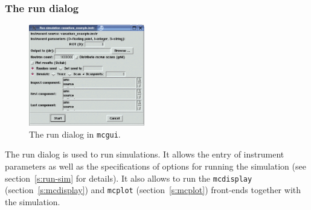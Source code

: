 \subsubsection{The run dialog}

\begin{figure}[htb!]
  \begin{center}
    \includegraphics[width=0.45\textwidth]{figures/mcgui-run.eps}
  \end{center}
\caption{The run dialog in \texttt{mcgui}.}
\label{fig:mcgui-run}
\end{figure}
%
The run dialog is used to run simulations. It allows the entry of
instrument parameters as well as the specifications of options for
running the simulation (see section~\ref{s:run-sim} for details). It
also allows to run the \verb+mcdisplay+ (section~\ref{s:mcdisplay}) and
\verb+mcplot+ (section~\ref{s:mcplot}) front-ends together with the
simulation.

